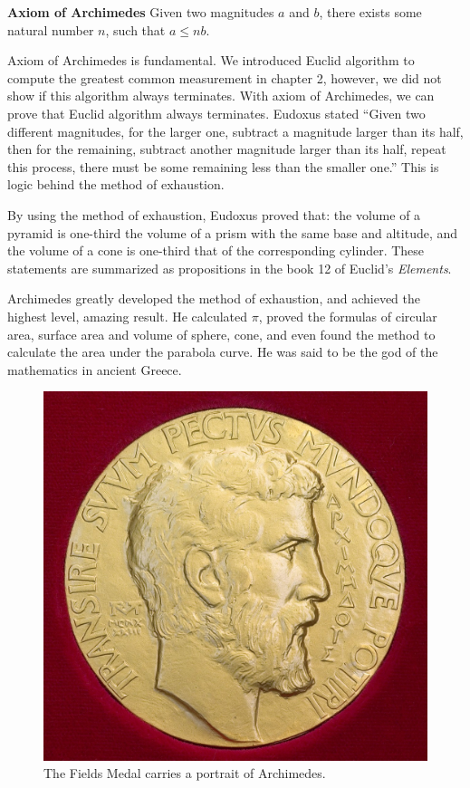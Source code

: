 \documentclass{article}
\begin{document}
\begin{axiom}
\normalfont
\textbf{Axiom of Archimedes} Given two magnitudes $a$ and $b$, there exists some natural number $n$, such that $a \leq nb$.
\end{axiom}

Axiom of Archimedes is fundamental. We introduced Euclid algorithm to compute the greatest common measurement in chapter 2, however, we did not show if this algorithm always terminates. With axiom of Archimedes, we can prove that Euclid algorithm always terminates. Eudoxus stated ``Given two different magnitudes, for the larger one, subtract a magnitude larger than its half, then for the remaining, subtract another magnitude larger than its half, repeat this process, there must be some remaining less than the smaller one.'' This is logic behind the method of exhaustion.

By using the method of exhaustion, Eudoxus proved that: the volume of a pyramid is one-third the volume of a prism with the same base and altitude, and the volume of a cone is one-third that of the corresponding cylinder. These statements are summarized as propositions in the book 12 of Euclid's {\em Elements}\cite{HanXueTao16}.

Archimedes greatly developed the method of exhaustion, and achieved the highest level, amazing result. He calculated $\pi$, proved the formulas of circular area, surface area and volume of sphere, cone, and even found the method to calculate the area under the parabola curve. He was said to be the god of the mathematics in ancient Greece.

\begin{figure}
 \centering
 \includegraphics[scale=0.1]{img/FieldsMedal.jpg}
 \captionsetup{labelformat=empty}
 \caption{The Fields Medal carries a portrait of Archimedes.}
 \label{fig:FieldsMedal}
\end{figure}
\end{document}

